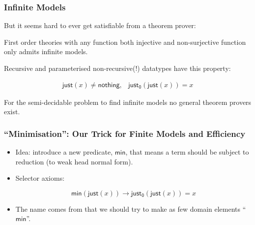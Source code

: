 \documentclass[serif,professionalfont]{beamer}
\begin{document}
\begin{frame}
  \frametitle{Infinite Models}

But it seems hard to ever get satisfiable from a theorem prover:

\begin{theorem}First order theories with any function both  injective and
  non-surjective function only admits infinite models.
\end{theorem}

Recursive and parameterised non-recursive(!) datatypes have this
property:

  \[\begin{array}{ll}
  \mathsf{just}(x) \neq \mathsf{nothing}, &
  \mathsf{just_0}(\mathsf{just}(x)) = x
  \end{array}\]

For the semi-decidable problem to find infinite models no general
theorem provers exist.

\end{frame}

\newcommand\Min[0]{\mathsf{min}}

\begin{frame}
  \frametitle{``Minimisation'': Our Trick for Finite Models and Efficiency }

  \begin{itemize}
    \item Idea: introduce a new predicate, $\Min$, that means a term
      should be subject to reduction (to weak head normal form).

    \item Selector axioms:

      $$
        \Min(\mathsf{just}(x)) \to \mathsf{just_0}(\mathsf{just}(x)) = x
      $$

    \item The name comes from that we should try to make as few domain
      elements ``$\Min$''.
  \end{itemize}

\end{frame}
\end{document}
